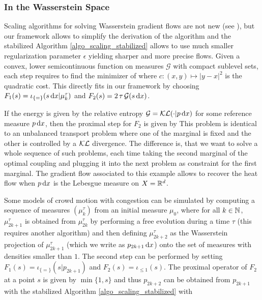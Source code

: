\subsubsection{In the Wasserstein Space}
Scaling algorithms for solving Wasserstein gradient flows are not new (see \cite{2015-Peyre-siims}), but our framework allows to simplify the derivation of the algorithm and the stabilized Algorithm \ref{algo_scaling_stabilized} allows to use much smaller regularization parameter $\epsilon$ yielding sharper and more precise flows. Given a convex, lower semicontinuous function on measures $\mathcal{G}$ with compact sublevel sets, each step requires to find the minimizer of
where $c :(x,y)\mapsto |y-x|^2$ is the quadratic cost. This directly fits in our framework by choosing $F_1(s) = \iota_{\{=\}}(s\, \mathrm{d} x| \mu_k^\tau)$ and $F_2(s) = 2 \, \tau \, \mathcal{G}(s\,\mathrm{d} x)$. 
%
\begin{example}
If the energy is given by the relative entropy $\mathcal{G}=\operatorname{\mathcal{KL}}(\cdot|p \, \mathrm{d} x)$ for some reference measure $p \, \mathrm{d} x$, then the proximal step for $F_2$ is given by 
This problem is identical to an unbalanced transport problem where one of the marginal is fixed and the other is controlled by a $\operatorname{\mathcal{KL}}$ divergence. The difference is, that we want to solve a whole sequence of such problems, each time taking the second marginal of the optimal coupling and plugging it into the next problem as constraint for the first marginal. The gradient flow associated to this example allows to recover the heat flow when $p\,\mathrm{d} x$ is the Lebesgue measure on $X=\mathbb{R}^d$.
\end{example}
%
\begin{example}
Some models of crowd motion with congestion \cite{roudneff2011handling} can be simulated by computing a sequence of measures $(\mu^\tau_{k})$ from an initial measure $\mu_0$, where for all $k\in \mathbb{N}$, $\mu^\tau_{2k+1}$ is obtained from $\mu^\tau_{2k}$ by performing a free evolution during a time $\tau$ (this requires another algorithm) and then defining $\mu^\tau_{2k+2}$ as the Wasserstein projection of $\mu_{2k+1}^\tau$ (which we write as $p_{2k+1}\,\mathrm{d} x$) onto the set of measures with densities smaller than $1$. The second step can be performed by setting $F_1(s) = \iota_{\{=\}}(s|p_{2k+1})$ and $F_2(s)=\iota_{\leq 1}(s)$. The proximal operator of $F_2$ at a point $s$ is given by $\min \{1,s\}$ and thus $p_{2k+2}$ can be obtained from $p_{2k+1}$ with the stabilized Algorithm \ref{algo_scaling_stabilized} with 
\end{example}

